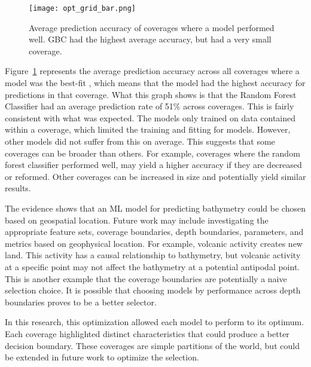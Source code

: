 \begin{figure}[htp]
    \centering
    \texttt{[image: opt\_grid\_bar.png]}
    \caption{Average prediction accuracy of coverages where a model performed well. 
    GBC had the highest average accuracy, but had a very small coverage.}
    \label{fig:grid_opt_graph}
\end{figure}

\par
Figure~\ref{fig:grid_opt_graph} represents the average prediction accuracy across all coverages where a model was the best-fit
, which means that the model had the highest accuracy for predictions in that coverage.
What this graph shows is that the Random Forest Classifier had an average prediction rate of 51\% across coverages.
This is fairly consistent with what was expected. 
The models only trained on data contained within a coverage, which limited the training and fitting for models. 
However, other models did not suffer from this on average.
This suggests that some coverages can be broader than others.
For example, coverages where the random forest classifier performed well, may yield a higher accuracy if they are decreased or reformed.
Other coverages can be increased in size and potentially yield similar results.


\par
The evidence shows that an \ac{ML} model for predicting bathymetry could be chosen based on geospatial location.
Future work may include investigating the appropriate feature sets, coverage boundaries, depth boundaries, parameters, and metrics based on geophysical location.
For example, volcanic activity creates new land.
This activity has a causal relationship to bathymetry, but volcanic activity at a specific point may not affect the bathymetry at a potential antipodal point.
This is another example that the coverage boundaries are potentially a naive selection choice.
It is possible that choosing models by performance across depth boundaries proves to be a better selector.
\par
In this research, this optimization allowed each model to perform to its optimum.
Each coverage highlighted distinct characteristics that could produce a better decision boundary.
These coverages are simple partitions of the world, but could be extended in future work to optimize the selection.



